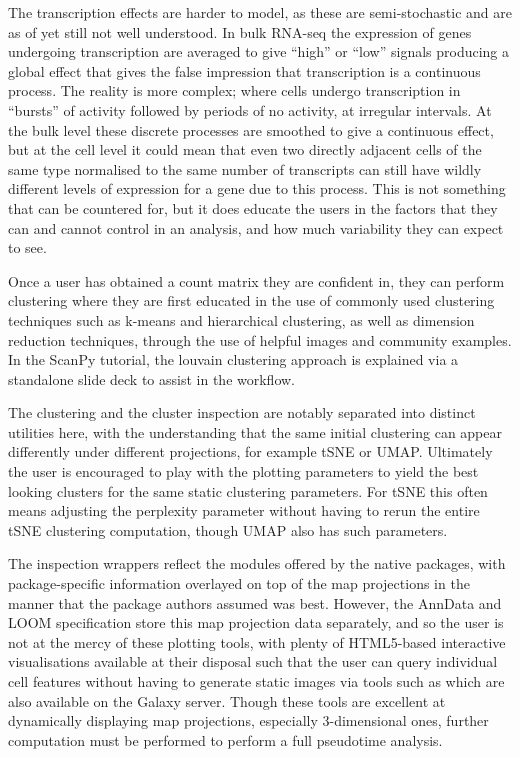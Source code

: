 \documentclass[a4paper,num-refs]{oup-contemporary}
\begin{document}
The transcription effects are harder to model, as these are semi-stochastic and are as of yet still not well understood. In bulk RNA-seq the expression of genes undergoing transcription are averaged to give ``high'' or ``low'' signals producing a global effect that gives the false impression that transcription is a continuous process. The reality is more complex; where cells undergo transcription in ``bursts'' of activity followed by periods of no activity, at irregular intervals. At the bulk level these discrete processes are smoothed to give a continuous effect, but at the cell level it could mean that even two directly adjacent cells of the same type normalised to the same number of transcripts can still have wildly different levels of expression for a gene due to this process. This is not something that can be countered for, but it does educate the users in the factors that they can and cannot control in an analysis, and how much variability they can expect to see.

Once a user has obtained a count matrix they are confident in, they can perform clustering where they are first educated in the use of commonly used clustering techniques such as k-means and hierarchical clustering, as well as dimension reduction techniques, through the use of helpful images and community examples.
In the ScanPy tutorial, the louvain clustering approach is explained via a standalone slide deck to assist in the workflow.

The clustering and the cluster inspection are notably separated into distinct utilities here, with the understanding that the same initial clustering can appear differently under different projections, for example tSNE or UMAP. Ultimately the user is encouraged to play with the plotting parameters to yield the best looking clusters for the same static clustering parameters. For tSNE this often means adjusting the perplexity parameter without having to rerun the entire tSNE clustering computation, though UMAP also has such parameters.

The inspection wrappers reflect the modules offered by the native packages, with package-specific information overlayed on top of the map projections in the manner that the package authors assumed was best. However, the AnnData and LOOM specification store this map projection data separately, and so the user is not at the mercy of these plotting tools, with plenty of HTML5-based interactive visualisations available at their disposal such that the user can query individual cell features without having to generate static images via tools such as  which are also available on the Galaxy server. Though these tools are excellent at dynamically displaying map projections, especially 3-dimensional ones, further computation must be performed to perform a full pseudotime analysis. 
\end{document}
